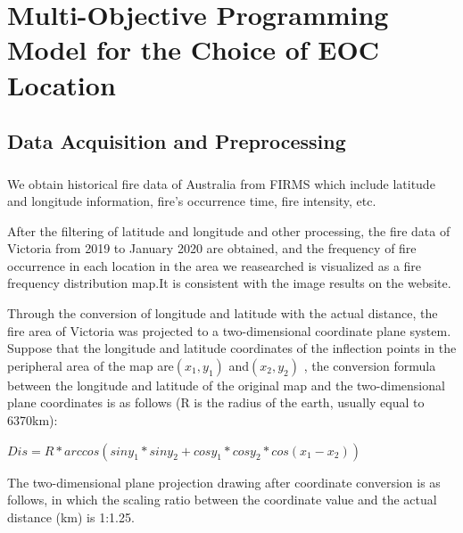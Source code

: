 \documentclass{mcmthesis}
\newcommand{\upcite}[1]{\textsuperscript{\textsuperscript{\cite{#1}}}}
\begin{document}
\section{Multi-Objective Programming Model for the Choice of EOC Location}
\subsection{Data Acquisition and Preprocessing}
We obtain historical fire data of Australia from FIRMS\upcite{fire_website} which include latitude and longitude information, fire's occurrence time, fire intensity, etc.

After the filtering of latitude and longitude and other processing, the fire data of Victoria from 2019 to January 2020 are obtained, and the frequency of fire occurrence in each location in the area we reasearched is visualized as a fire frequency distribution map.It is consistent with the image results on the website.

Through the conversion of longitude and latitude with the actual distance, the fire area of Victoria was projected to a two-dimensional coordinate plane system. Suppose that the longitude and latitude coordinates of the inflection points in the peripheral area of the map are$ (x_1, y_1)$ and$ (x_2, y_2)$ , the conversion formula between the longitude and latitude of the original map and the two-dimensional plane coordinates is as follows (R is the radius of the earth, usually equal to 6370km):

$Dis=R*arccos(siny_1*siny_2+cosy_1*cosy_2*cos (x_1-x_2))$

The two-dimensional plane projection drawing after coordinate conversion is as follows, in which the scaling ratio between the coordinate value and the actual distance (km) is 1:1.25.
\end{document}
